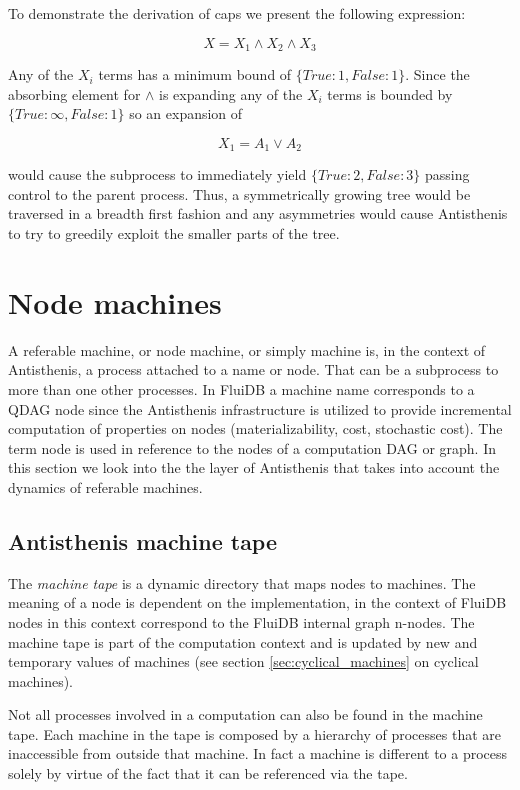 To demonstrate the derivation of caps we present the following
expression:

\[
X = X_1 \land X_2 \land X_3
\]

Any of the \(X_i\) terms has a minimum bound of
\(\{True: 1, False: 1 \}\). Since the absorbing element for \(\land\)
is  expanding any of the \(X_i\) terms is bounded by
\(\{True: \infty, False: 1 \}\) so an expansion of

\[
X_1 = A_1 \lor A_2
\]

would cause the subprocess to immediately yield
\(\{True: 2, False: 3 \}\) passing control to the parent
process. Thus, a symmetrically growing tree would be traversed in a
breadth first fashion and any asymmetries would cause Antisthenis to
try to greedily exploit the smaller parts of the tree.

\section{Node machines}
\label{sec:antisthenis_machines}

A referable machine, or node machine, or simply machine is, in the
context of Antisthenis, a process attached to a name or node. That can
be a subprocess to more than one other processes. In FluiDB a machine
name corresponds to a QDAG node since the Antisthenis infrastructure
is utilized to provide incremental computation of properties on nodes
(materializability, cost, stochastic cost). The term node is used in
reference to the nodes of a computation DAG or graph. In this section
we look into the the layer of Antisthenis that takes into account the
dynamics of referable machines.

\subsection{Antisthenis machine tape}

The \emph{machine tape} is a dynamic directory that maps nodes to
machines. The meaning of a node is dependent on the implementation, in
the context of FluiDB nodes in this context correspond to the FluiDB
internal graph n-nodes.  The machine tape is part of the computation
context and is updated by new and temporary values of machines (see
section \ref{sec:cyclical_machines} on cyclical machines).

Not all processes involved in a computation can also be found in the
machine tape. Each machine in the tape is composed by a hierarchy of
processes that are inaccessible from outside that machine. In fact a
machine is different to a process solely by virtue of the fact that it
can be referenced via the tape.

